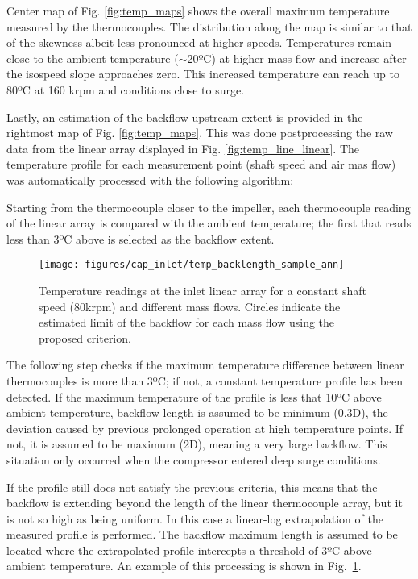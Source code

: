Center map of Fig. \ref{fig:temp_maps} shows the overall maximum temperature measured by the thermocouples. The distribution along the map is similar to that of the skewness albeit less pronounced at higher speeds. Temperatures remain close to the ambient temperature ($\sim$20ºC) at higher mass flow and increase after the isospeed slope approaches zero. This increased temperature can reach up to 80ºC at 160 krpm and conditions close to surge.

Lastly, an estimation of the backflow upstream extent is provided in the rightmost map of Fig. \ref{fig:temp_maps}. This was done postprocessing the raw data from the linear array displayed in Fig. \ref{fig:temp_line_linear}. The temperature profile for each measurement point (shaft speed and air mas flow) was automatically processed with the following algorithm:

Starting from the thermocouple closer to the impeller, each thermocouple reading of the linear array is compared with the ambient temperature; the first that reads less than 3ºC above is selected as the backflow extent.

\begin{figure}[tb!]
\centering
\texttt{[image: figures/cap\_inlet/temp\_backlength\_sample\_ann]}
\caption{Temperature readings at the inlet linear array for a constant shaft speed (80krpm) and different mass flows. Circles indicate the estimated limit of the backflow for each mass flow using the proposed criterion.}
\label{fig:temp_backlength_sample}
\end{figure}

The following step checks if the maximum temperature difference between linear thermocouples is more than 3ºC; if not,  a constant temperature profile has been detected. If the maximum temperature of the profile is less that 10ºC above ambient temperature, backflow length is assumed to be minimum (0.3D), the deviation caused by previous prolonged operation at high temperature points. If not, it is assumed to be maximum (2D), meaning a very large backflow. This situation only occurred when the compressor entered deep surge conditions.

If the profile still does not satisfy the previous criteria, this means that the backflow is extending beyond the length of the linear thermocouple array, but it is not so high as being uniform. In this case a linear-log extrapolation of the measured profile is performed. The backflow maximum length is assumed to be located where the extrapolated profile intercepts a threshold of 3ºC above ambient temperature. An example of this processing is shown in Fig.~\ref{fig:temp_backlength_sample}.


